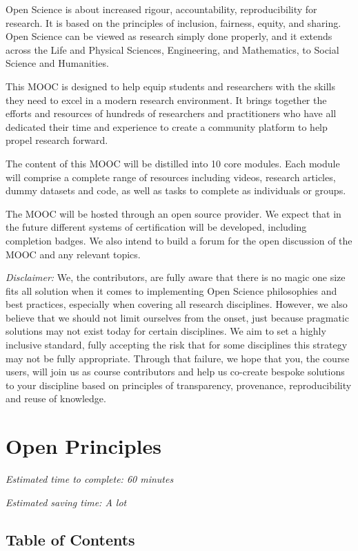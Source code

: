 \documentclass[]{book}
\begin{document}
Open Science is about increased rigour, accountability, reproducibility for research. It is based on the principles of inclusion, fairness, equity, and sharing. Open Science can be viewed as research simply done properly, and it extends across the Life and Physical Sciences, Engineering, and Mathematics, to Social Science and Humanities.

This MOOC is designed to help equip students and researchers with the skills they need to excel in a modern research environment. It brings together the efforts and resources of hundreds of researchers and practitioners who have all dedicated their time and experience to create a community platform to help propel research forward.

The content of this MOOC will be distilled into 10 core modules. Each module will comprise a complete range of resources including videos, research articles, dummy datasets and code, as well as tasks to complete as individuals or groups.

The MOOC will be hosted through an open source provider. We expect that in the future different systems of certification will be developed, including completion badges. We also intend to build a forum for the open discussion of the MOOC and any relevant topics.

\emph{Disclaimer:} We, the contributors, are fully aware that there is no magic one size fits all solution when it comes to implementing Open Science philosophies and best practices, especially when covering all research disciplines. However, we also believe that we should not limit ourselves from the onset, just because pragmatic solutions may not exist today for certain disciplines. We aim to set a highly inclusive standard, fully accepting the risk that for some disciplines this strategy may not be fully appropriate. Through that failure, we hope that you, the course users, will join us as course contributors and help us co-create bespoke solutions to your discipline based on principles of transparency, provenance, reproducibility and reuse of knowledge.

\hypertarget{module1}{%
\chapter{Open Principles}\label{module1}}

\emph{Estimated time to complete: 60 minutes}

\emph{Estimated saving time: A lot}

\hypertarget{table-of-contents}{%
\section*{Table of Contents}\label{table-of-contents}}
\end{document}
